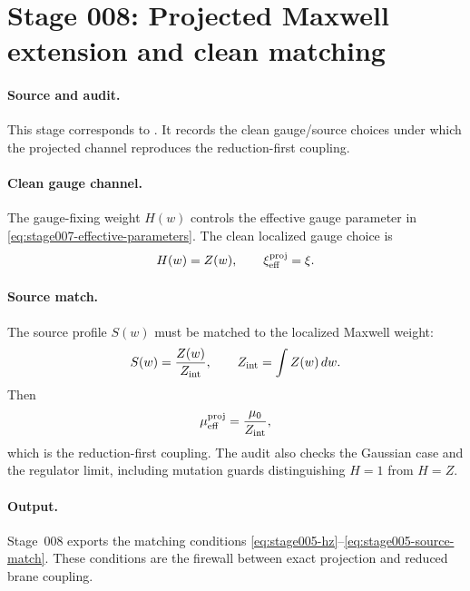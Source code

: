 \section[Stage 008]{Stage 008: Projected Maxwell extension and clean matching}
\label{stage:008}


\paragraph{Source and audit.}
This stage corresponds to
.
It records the clean gauge/source choices under which the projected channel
reproduces the reduction-first coupling.

\paragraph{Clean gauge channel.}
The gauge-fixing weight \(H(w)\) controls the effective gauge parameter in
\eqref{eq:stage007-effective-parameters}.  The clean localized gauge choice
is
\begin{equation}
\label{eq:stage005-hz}
H(w)=Z(w),
\qquad
\xi_{\rm eff}^{\rm proj}=\xi .
\end{equation}

\paragraph{Source match.}
The source profile \(S(w)\) must be matched to the localized Maxwell weight:
\begin{equation}
\label{eq:stage005-source-match}
S(w)=\frac{Z(w)}{Z_{\rm int}},
\qquad
Z_{\rm int}=\int Z(w)\,dw .
\end{equation}
Then
\begin{equation}
\mu_{\rm eff}^{\rm proj}=\frac{\mu_0}{Z_{\rm int}},
\end{equation}
which is the reduction-first coupling.  The audit also checks the Gaussian
case and the regulator limit, including mutation guards distinguishing
\(H=1\) from \(H=Z\).

\paragraph{Output.}
Stage~008 exports the matching conditions
\eqref{eq:stage005-hz}--\eqref{eq:stage005-source-match}.  These
conditions are the firewall between exact projection and reduced brane
coupling.
